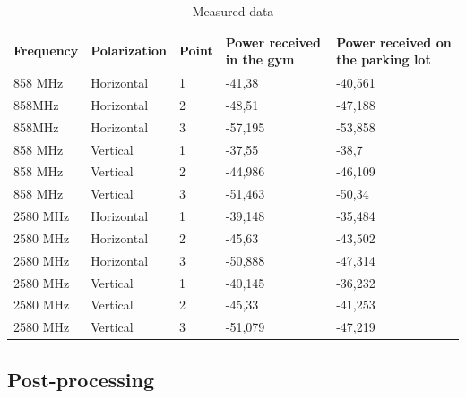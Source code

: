 \begin{table}[H]
\centering
\label{my-label}
\begin{tabular}{|l|l|l|p{3.5cm}|p{3.5cm}|}
\hline
\textbf{Frequency} & \textbf{Polarization} & \textbf{Point} & \textbf{Power received in the gym} & \textbf{Power received on the parking lot} \\ \hline
858 MHz            & Horizontal            & 1              & -41,38		& -40,561		\\ \hline
858MHz             & Horizontal            & 2              & -48,51		& -47,188		\\ \hline
858MHz             & Horizontal            & 3              & -57,195 		& -53,858		\\ \hline
858 MHz            & Vertical              & 1              & -37,55 		& -38,7			\\ \hline
858 MHz            & Vertical              & 2              & -44,986		& -46,109		\\ \hline
858 MHz            & Vertical              & 3              & -51,463		& -50,34		\\ \hline
2580 MHz           & Horizontal            & 1              & -39,148		& -35,484		\\ \hline
2580 MHz           & Horizontal            & 2              & -45,63		& -43,502		\\ \hline
2580 MHz           & Horizontal            & 3              & -50,888		& -47,314		\\ \hline
2580 MHz           & Vertical              & 1              & -40,145		& -36,232		\\ \hline
2580 MHz           & Vertical              & 2              & -45,33		& -41,253		\\ \hline
2580 MHz           & Vertical              & 3              & -51,079		& -47,219		\\ \hline
\end{tabular}
\caption{Measured data}
\label{tab:data}
\end{table}

\subsection{Post-processing}
